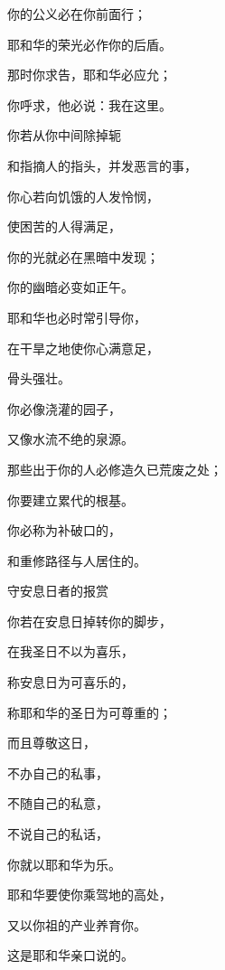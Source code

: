 {\par }{\Q 你的公义必在你前面行；
\par }{\Q 耶和华的荣光必作你的后盾。
\par }{\Q {}那时你求告，耶和华必应允；
\par }{\Q 你呼求，他必说：我在这里。
\par }{\BB \par }{\Q 你若从你中间除掉{}轭
\par }{\Q 和指摘人的指头，并发恶言的事，
\par }{\Q {}你心若向饥饿的人发怜悯，
\par }{\Q 使困苦的人得满足，
\par }{\Q 你的光就必在黑暗中发现；
\par }{\Q 你的幽暗必变如正午。
\par }{\Q {}耶和华也必时常引导你，
\par }{\Q 在干旱之地使你心满意足，
\par }{\Q 骨头强壮。
\par }{\Q 你必像浇灌的园子，
\par }{\Q 又像水流不绝的泉源。
\par }{\Q {}那些出于你的人必修造久已荒废之处；
\par }{\Q 你要建立{}累代的根基。
\par }{\Q 你必称为补破口的，
\par }{\Q 和重修路径与人居住的。
\par }{\SH 守安息日者的报赏
\par }{\Q {}你若在安息日掉转你的脚步，
\par }{\Q 在我圣日不以{}为喜乐，
\par }{\Q 称安息日为可喜乐的，
\par }{\Q 称耶和华的圣日为可尊重的；
\par }{\Q 而且尊敬这日，
\par }{\Q 不办自己的私事，
\par }{\Q 不随自己的私意，
\par }{\Q 不说自己的私话，
\par }{\Q {}你就以耶和华为乐。
\par }{\Q 耶和华要使你乘驾地的高处，
\par }{\Q 又以你祖{}的产业养育你。
\par }{\Q 这是耶和华亲口说的。

}
